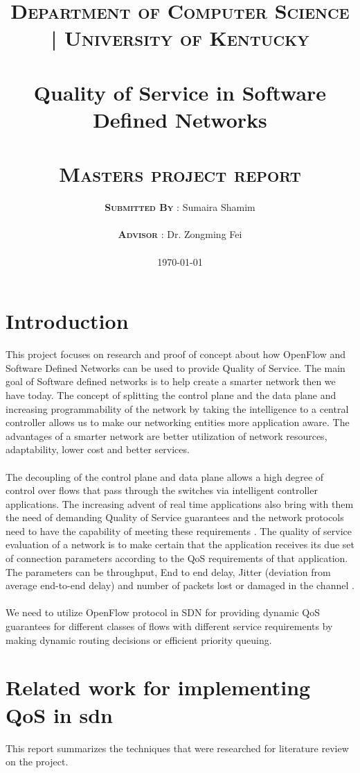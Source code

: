 \documentclass[paper=a4, fontsize=11pt]{scrartcl}	%
\title{
		\usefont{OT1}{bch}{b}{n}
		\normalfont \normalsize \textsc{\textbf{Department of Computer Science | University of Kentucky}} \\ [28pt]
		\horrule{0.5pt} \\[0.4cm]
		\huge Quality of Service in Software Defined Networks\\
		\horrule{2pt} \\[0.5cm]
		\normalfont \normalsize \textsc{\textbf{Masters project report}}
}
\author{
		\normalfont \normalsize \textsc{\textbf{Submitted By}} 
		\normalfont 								\normalsize
       	{: Sumaira Shamim}\\[-3pt]		\normalsize \\
       	\normalfont \normalsize \textsc{\textbf{Advisor}} 
       	\normalfont 								\normalsize
       	{: Dr. Zongming Fei}\\[-3pt]		\normalsize \\
  \today      
}
\date{}
\numberwithin{equation}{section}		%
\numberwithin{figure}{section}			%
\numberwithin{table}{section}				%
\begin{document}
\maketitle
\thispagestyle{empty}

\newpage
\setcounter{page}{1}
\tableofcontents
\newpage

\section{Introduction}
This project focuses on research and proof of concept about how OpenFlow and Software Defined Networks can be used to provide Quality of Service. The main goal of Software defined networks is to help create a smarter network then we have today. The concept of splitting the control plane and the data plane and increasing programmability of the network by taking the intelligence to a central controller allows us to make our networking entities more application aware. The advantages of a smarter network are better utilization of network resources, adaptability, lower cost and better services.
\\
\\
The decoupling of the control plane and data plane allows a high degree of control over flows that pass through the switches via intelligent controller applications. The increasing advent of real time applications also bring with them the need of demanding Quality of Service guarantees and the network protocols need to have the capability of meeting these requirements \cite{thesis}. The quality of service evaluation of a network is to make certain that the application receives its due set of connection parameters according to the QoS requirements of that application. The parameters can be throughput, End to end delay, Jitter (deviation from average end-to-end delay) and number of packets lost or damaged in the channel \cite{multipath}. 
\\
\\
We need to utilize OpenFlow protocol in SDN for providing dynamic QoS guarantees for different classes of flows with different service requirements by making dynamic routing decisions or efficient priority queuing. 

\section{Related work for implementing QoS in sdn}
This report summarizes the techniques that were researched for literature review on the project.
\end{document}

